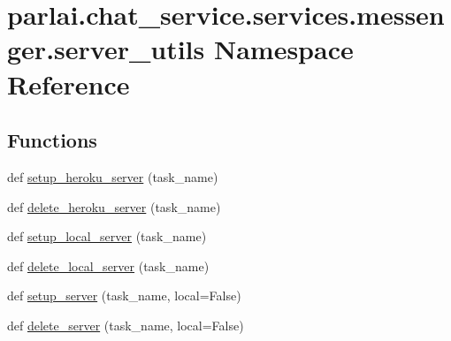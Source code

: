\hypertarget{namespaceparlai_1_1chat__service_1_1services_1_1messenger_1_1server__utils}{}\section{parlai.\+chat\+\_\+service.\+services.\+messenger.\+server\+\_\+utils Namespace Reference}
\label{namespaceparlai_1_1chat__service_1_1services_1_1messenger_1_1server__utils}
\subsection*{Functions}
\begin{DoxyCompactItemize}
\item 
def \hyperlink{namespaceparlai_1_1chat__service_1_1services_1_1messenger_1_1server__utils_ad6686d06420159711f730caba7e82964}{setup\+\_\+heroku\+\_\+server} (task\+\_\+name)
\item 
def \hyperlink{namespaceparlai_1_1chat__service_1_1services_1_1messenger_1_1server__utils_ad2f0d428e09b0ce197091c41c21dfafb}{delete\+\_\+heroku\+\_\+server} (task\+\_\+name)
\item 
def \hyperlink{namespaceparlai_1_1chat__service_1_1services_1_1messenger_1_1server__utils_a89bf62978803958356c32096df679432}{setup\+\_\+local\+\_\+server} (task\+\_\+name)
\item 
def \hyperlink{namespaceparlai_1_1chat__service_1_1services_1_1messenger_1_1server__utils_a94445c358161efa9329ecbeefadb01dc}{delete\+\_\+local\+\_\+server} (task\+\_\+name)
\item 
def \hyperlink{namespaceparlai_1_1chat__service_1_1services_1_1messenger_1_1server__utils_afb56b04206cd0f42384438f1ac6d9cda}{setup\+\_\+server} (task\+\_\+name, local=False)
\item 
def \hyperlink{namespaceparlai_1_1chat__service_1_1services_1_1messenger_1_1server__utils_a0dd350cc27da7cfdc225f8daf19d5e57}{delete\+\_\+server} (task\+\_\+name, local=False)
\end{DoxyCompactItemize}
